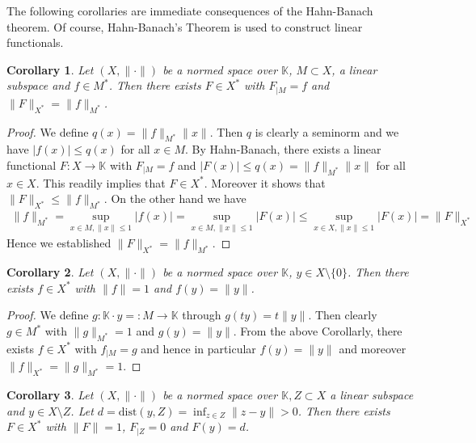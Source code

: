 \documentclass[11pt,a4paper]{article}
\newtheorem{cor}{Corollary}[section]
\theoremstyle{definition}
\begin{document}
\noindent The following corollaries are immediate consequences of the Hahn-Banach theorem. Of course, Hahn-Banach's Theorem is used to construct linear functionals. 
\newpage
\begin{cor} Let $(X, \| \cdot \|)$ be a normed space over $\mathbb{K}$, $M \subset X$, a linear subspace and $f \in M^*$. Then there exists $F \in X^*$ with $F_{ \mid M} = f$ and $\|F\|_{X^*} = \|f\|_{M^*}$. 
\end{cor}
\begin{proof}
We define $q(x)= \|f\|_{M^*} \|x\|$. Then $q$ is clearly a seminorm and we have $|f(x)| \leq q(x)$ for all $x \in M$. By Hahn-Banach, there exists a linear functional $F: X \to \mathbb{K}$ with $F_{ \mid M} = f$ and $|F(x)| \leq q(x) = \|f\|_{M^*} \|x\|$ for all $x \in X$. This readily implies that $F \in X^*$. Moreover it shows that $\|F\|_{X^*} \leq \|f\|_{M^*}$. On the other hand we have 
\begin{align*}
\|f\|_{M^*} = \sup_{x \in M, \|x\| \leq 1} |f(x)| = \sup_{x \in M, \|x \| \leq 1} | F(x)| \leq \sup_{x \in X, \|x \| \leq 1 } |F(x)| = \|F\|_{X^*}
\end{align*}
Hence we established $\|F\|_{X^*} = \|f\|_{M^*}.$
\end{proof}
\begin{cor} Let $(X, \| \cdot \|)$ be a normed space over $\mathbb{K}$, $y \in X \setminus \lbrace 0 \rbrace$. Then there exists $f \in X^*$ with $\|f\|=1$ and $f(y)= \|y\|$. 
\end{cor}
\begin{proof} We define $g: \mathbb{K} \cdot y =: M \to  \mathbb{K}$ through $g(ty)= t \|y\|$. Then clearly $g \in M^*$ with $\|g\|_{M^*}=1$ and $g(y)= \|y\|$. From the above Corollarly, there exists $f \in X^*$ with $f_{ \mid M} = g$ and hence in particular $f(y)=\|y\|$ and moreover $\|f\|_{X^*}=\|g\|_{M^*}=1$.
\end{proof} 
\begin{cor} Let $(X, \| \cdot \|)$ be a normed space over $\mathbb{K}, Z \subset X$ a linear subspace and $y \in X \setminus Z$. Let $d= \text{dist}(y,Z)= \inf_{z \in Z} \| z-y\| >0$. Then there exists $F \in X^*$ with $\|F\|=1$, $F_{ \mid Z} =0$ and $F(y)=d$. 
\end{cor}
\end{document}
